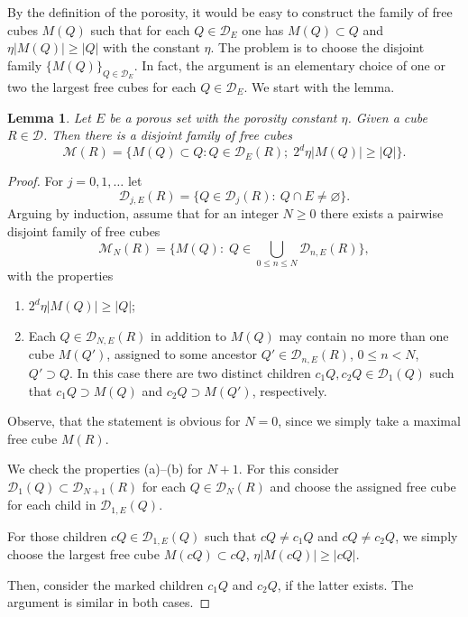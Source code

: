\documentclass[12pt]{amsart} \setlength{\textwidth}{15cm} \setlength{\textheight}{24cm} \setlength{\voffset}{-1cm} \setlength{\oddsidemargin}{-0.4cm} \setlength{\evensidemargin}{-0.4cm}
\newtheorem {lemma}  [theorem]{Lemma}
\theoremstyle{definition}
\theoremstyle{remark}
\begin{document}
  By the definition of the porosity, it would be easy to construct the family of free cubes $M(Q)$ such that for each $Q \in\mathcal{D}_E$  one has  $ M(Q) \subset Q$ and $\eta | M(Q)| \geq |Q|$ with the  constant $\eta$. The  problem is to choose  the disjoint family $\{M(Q)\}_{Q \in \mathcal{D}_E}$. In fact, the argument is an elementary choice of one or two the largest free cubes for each  $Q \in \mathcal{D}_E$. We start with the lemma.
 \begin{lemma}\label{lem}
   Let  $E$ be a porous set with the porosity constant $\eta$. Given  a cube $R\in \mathcal{D}$. Then there is a  disjoint family of free cubes
   \[\mathcal{M}(R) = \{M(Q) \subset Q: Q \in \mathcal{D}_E(R);\;  2^d \eta | M(Q)| \geq |Q|\}.\]
    \end{lemma}
   \begin{proof}
    For $j=0,1,\dots$ let
\[\mathcal{D}_{j,E}(R)=\{Q \in \mathcal{D}_j(R): \:  Q \cap E \neq \varnothing\}.\]
Arguing by induction,  assume that for an integer $ N\geq 0$ there exists a pairwise disjoint family of free cubes
    \[ \mathcal{M}_N(R)=\{M(Q): \;  Q \in \bigcup _{0 \leq n \leq N}\mathcal{D}_{n,E}(R)\},\]
     with the properties
      \begin{enumerate}
         \item[(a)] $ 2^d \eta | M(Q)| \geq |Q|$;
          \item [(b)] Each $Q \in \mathcal{D}_{N,E}(R)$  in addition to    $M(Q)$ may contain no more than one cube $M(Q')$, assigned to  some ancestor $Q' \in \mathcal{D}_{n,E}(R)$, $ 0 \leq n <N$, $Q' \supset Q$.  In this  case there are two distinct children $c_1Q, c_2Q \in  \mathcal{D}_1 (Q)$  such that $c_1Q\supset M(Q)$ and    $c_2Q\supset M(Q')$, respectively.
  \end{enumerate}
 Observe, that the statement is obvious for $N=0$, since we simply take a maximal free cube $M(R)$.

   We check the properties (a)--(b) for $N+1$. For this consider   $\mathcal{D}_1 (Q) \subset\mathcal{D}_{N+1}(R)$ for each $Q \in \mathcal{D}_N(R)$ and choose the assigned free cube for each child in $ \mathcal{D}_{1,E} (Q)$.

   For those children $cQ \in \mathcal{D}_{1,E} (Q)$ such that  $cQ \neq c_1Q$ and  $cQ \neq c_2Q$, we simply choose the largest  free cube $M(cQ) \subset cQ$, $\eta |M(cQ)| \geq  |c Q|$.

   Then, consider the marked children  $c_1Q $ and $c_2Q$, if the latter exists.
    The argument is similar in  both cases.


\end{proof}
\end{document}
